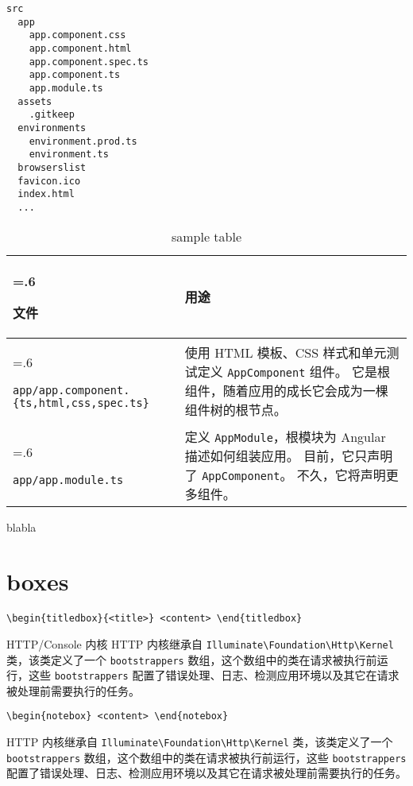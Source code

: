 \documentclass{progartcn}
\begin{document}
\begin{lstlisting}[style=bashoutputstyle]
src
  app
    app.component.css
    app.component.html
    app.component.spec.ts
    app.component.ts
    app.module.ts
  assets
    .gitkeep
  environments
    environment.prod.ts
    environment.ts
  browserslist
  favicon.ico
  index.html
  ...
\end{lstlisting}

\noindent
\begin{table}[h!]
  \caption{sample table}\label{table:1}
  \begin{tabularx}{\textwidth}{>{\hsize=.6\hsize\raggedright\arraybackslash}X>{\raggedright\arraybackslash}X}\toprule
    文件 & 用途\\ \midrule
    \verb|app/app.component.{ts,html,css,spec.ts}| & 使用 HTML 模板、CSS 样式和单元测试定义 \verb|AppComponent| 组件。 它是根组件，随着应用的成长它会成为一棵组件树的根节点。\\
    \verb|app/app.module.ts| & 定义 \verb|AppModule|，根模块为 Angular 描述如何组装应用。 目前，它只声明了 \verb|AppComponent|。 不久，它将声明更多组件。\\ \bottomrule
  \end{tabularx}
\end{table}
blabla

\clearpage

\section{boxes}

\noindent\verb|\begin{titledbox}{<title>} <content> \end{titledbox}|

\begin{titledbox}{HTTP/Console 内核}
  HTTP 内核继承自 \verb|Illuminate\Foundation\Http\Kernel| 类，该类定义了一个 \verb|bootstrappers| 数组，这个数组中的类在请求被执行前运行，这些 \verb|bootstrappers| 配置了错误处理、日志、检测应用环境以及其它在请求被处理前需要执行的任务。
\end{titledbox}

\noindent\verb|\begin{notebox} <content> \end{notebox}|

\begin{notebox}
  HTTP 内核继承自 \verb|Illuminate\Foundation\Http\Kernel| 类，该类定义了一个 \verb|bootstrappers| 数组，这个数组中的类在请求被执行前运行，这些 \verb|bootstrappers| 配置了错误处理、日志、检测应用环境以及其它在请求被处理前需要执行的任务。
\end{notebox}
\end{document}

